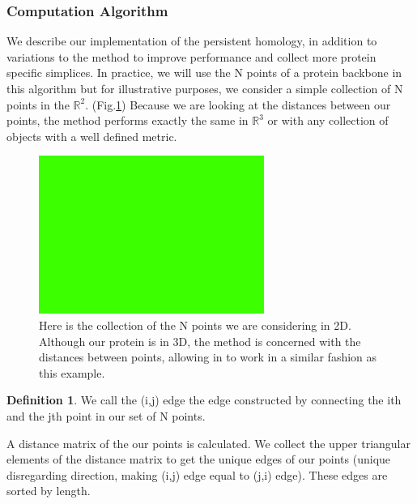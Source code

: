 \documentclass[12pt, a4paper, twocolumn, fullpage]{article}
\theoremstyle{plain}
\theoremstyle{definition}
\newtheorem{defn}{Definition}[section]
\theoremstyle{remark}
\begin{document}

\subsubsection{Computation Algorithm}
We describe our implementation of the persistent homology, in addition to variations to the method to improve performance and collect more protein specific simplices. 
In practice, we will use the N points of a protein backbone in this algorithm but for illustrative purposes, we consider a simple collection of N points in the $\mathbb{R}^2$. (Fig.\ref{Collection of points}) Because we are looking at the distances between our points, the method performs exactly the same in $\mathbb{R}^3$ or with any collection of objects with a well defined metric.

\begin{figure}[t]
    \includegraphics[width=\linewidth]{img/blank.png}
    \caption{Here is the collection of the N points we are considering in 2D. Although our protein is in 3D, the method is concerned with the distances between points, allowing in to work in a similar fashion as this example.}
    \label{Collection of points}
\end{figure}

\begin{defn}
We call the (i,j) edge the edge constructed by connecting the ith and the jth point in our set of N points.
\end{defn}

A distance matrix of the our points is calculated. We collect the upper triangular elements of the distance matrix to get the unique edges of our points (unique disregarding direction, making (i,j) edge equal to (j,i) edge). These edges are sorted by length.
\end{document}
